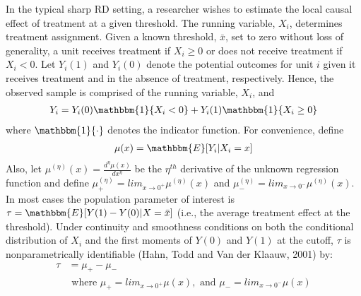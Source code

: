 \documentclass[12pt,fleqn]{article}
\begin{document}
In the typical sharp RD setting, a researcher wishes to estimate the local 
causal effect of treatment at a given threshold. The running variable, $X_{i}$, 
determines treatment assignment.  Given a known threshold, $\bar{x}$, set to 
zero without loss of generality, a unit receives treatment if $X_{i} \geq 0$ or 
does not receive treatment if $X_{i} < 0$. Let $Y_{i}(1)$ and $Y_{i}(0)$ denote 
the potential outcomes for unit $i$ given it receives treatment and
 in the absence of treatment, respectively. Hence, the observed sample is 
 comprised of the running variable, $X_{i}$, and
 \begin{align}
  Y_{i}=Y_{i}(0) \mathbbm{1}\{X_{i}<0\}+Y_{i}(1) \mathbbm{1}\{X_{i} \geq 0\}
 \end{align}
where $\mathbbm{1}\{ \cdot\}$ denotes the indicator function. For convenience, 
define
 \begin{align}
  \mu(x)= \mathbbm{E}[Y_{i}|X_{i}=x]
 \end{align}
Also, let $\mu^{(\eta)}(x)=\frac{d^{\eta}\mu(x)}{dx^{\eta}}$ be the $\eta^{th}$ 
derivative of the unknown regression function and define 
$\mu^{(\eta)}_{+}=lim_{x \rightarrow 0^{+}}\mu^{(\eta)}(x)$ and 
$\mu^{(\eta)}_{-}=lim_{x \rightarrow 0^{-}}\mu^{(\eta)}(x)$.
In most cases the population parameter of interest is 
$\tau=\mathbbm{E}[Y(1)-Y(0)|X=\bar{x}]$ (i.e., the average treatment effect 
at the threshold). Under continuity and smoothness conditions on both the 
conditional distribution of $X_i$ and the first moments of $Y(0)$ and $Y(1)$ at
the cutoff, $\tau$ is nonparametrically identifiable (Hahn, Todd and Van der 
Klaauw, 2001) by:
\begin{align}
 \tau&= \mu_{+}- \mu_{-} \nonumber \\ 
&\text{ where } \mu_{+}=lim_{x \rightarrow 0^{+}}\mu(x),\text{ and } 
\mu_{-}=lim_{x \rightarrow 0^{-}}\mu(x)
\end{align}
\end{document}
